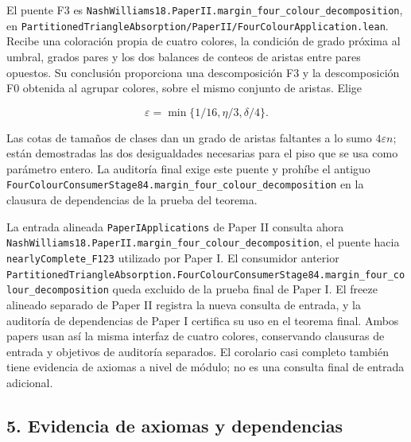 \documentclass[spanish,11pt,a4paper]{article}
\begin{document}
El puente F3 es \texttt{Nash\allowbreak{}Williams18.\allowbreak{}Paper\allowbreak{}II.\allowbreak{}margin\_\allowbreak{}four\_\allowbreak{}colour\_\allowbreak{}decomposition}, en \texttt{Partitioned\allowbreak{}Triangle\allowbreak{}Absorption/\allowbreak{}Paper\allowbreak{}II/\allowbreak{}Four\allowbreak{}Colour\allowbreak{}Application.\allowbreak{}lean}. Recibe una coloración propia de cuatro colores, la condición de grado próxima al umbral, grados pares y los dos balances de conteos de aristas entre pares opuestos. Su conclusión proporciona una descomposición F3 y la descomposición F0 obtenida al agrupar colores, sobre el mismo conjunto de aristas. Elige

\[\varepsilon=\min\{1/16,\eta/3,\delta/4\}.\]

Las cotas de tamaños de clases dan un grado de aristas faltantes a lo sumo \(4\varepsilon n\); están demostradas las dos desigualdades necesarias para el piso que se usa como parámetro entero. La auditoría final exige este puente y prohíbe el antiguo \texttt{Four\allowbreak{}Colour\allowbreak{}Consumer\allowbreak{}Stage84.\allowbreak{}margin\_\allowbreak{}four\_\allowbreak{}colour\_\allowbreak{}decomposition} en la clausura de dependencias de la prueba del teorema.

La entrada alineada \texttt{Paper\allowbreak{}IApplications} de Paper II consulta ahora \texttt{Nash\allowbreak{}Williams18.\allowbreak{}Paper\allowbreak{}II.\allowbreak{}margin\_\allowbreak{}four\_\allowbreak{}colour\_\allowbreak{}decomposition}, el puente hacia \texttt{nearly\allowbreak{}Complete\_\allowbreak{}F123} utilizado por Paper I. El consumidor anterior \texttt{Partitioned\allowbreak{}Triangle\allowbreak{}Absorption.\allowbreak{}Four\allowbreak{}Colour\allowbreak{}Consumer\allowbreak{}Stage84.\allowbreak{}margin\_\allowbreak{}four\_\allowbreak{}colour\_\allowbreak{}decomposition} queda excluido de la prueba final de Paper I. El freeze alineado separado de Paper II registra la nueva consulta de entrada, y la auditoría de dependencias de Paper I certifica su uso en el teorema final. Ambos papers usan así la misma interfaz de cuatro colores, conservando clausuras de entrada y objetivos de auditoría separados. El corolario casi completo también tiene evidencia de axiomas a nivel de módulo; no es una consulta final de entrada adicional.


\subsection{5. Evidencia de axiomas y dependencias}\label{evidencia-de-axiomas-y-dependencias}
\end{document}
